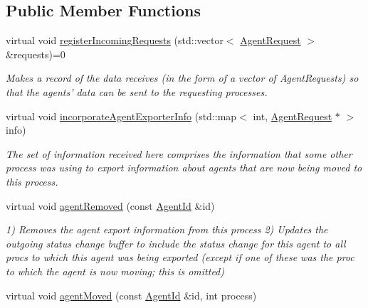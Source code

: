 \subsection*{Public Member Functions}
\begin{DoxyCompactItemize}
\item 
\hypertarget{classrepast_1_1_abstract_exporter_aaf345aa59918904df1847a432f600fba}{virtual void \hyperlink{classrepast_1_1_abstract_exporter_aaf345aa59918904df1847a432f600fba}{register\-Incoming\-Requests} (std\-::vector$<$ \hyperlink{classrepast_1_1_agent_request}{Agent\-Request} $>$ \&requests)=0}\label{classrepast_1_1_abstract_exporter_aaf345aa59918904df1847a432f600fba}

\begin{DoxyCompactList}\small\item\em Makes a record of the data receives (in the form of a vector of Agent\-Requests) so that the agents' data can be sent to the requesting processes. \end{DoxyCompactList}\item 
virtual void \hyperlink{classrepast_1_1_abstract_exporter_a6f75977191b82e5b0c7fc574a9fd4aa1}{incorporate\-Agent\-Exporter\-Info} (std\-::map$<$ int, \hyperlink{classrepast_1_1_agent_request}{Agent\-Request} $\ast$ $>$ info)
\begin{DoxyCompactList}\small\item\em The set of information received here comprises the information that some other process was using to export information about agents that are now being moved to this process. \end{DoxyCompactList}\item 
\hypertarget{classrepast_1_1_abstract_exporter_af3aae158eb37f412c3cb64b7e3be6821}{virtual void \hyperlink{classrepast_1_1_abstract_exporter_af3aae158eb37f412c3cb64b7e3be6821}{agent\-Removed} (const \hyperlink{classrepast_1_1_agent_id}{Agent\-Id} \&id)}\label{classrepast_1_1_abstract_exporter_af3aae158eb37f412c3cb64b7e3be6821}

\begin{DoxyCompactList}\small\item\em 1) Removes the agent export information from this process 2) Updates the outgoing status change buffer to include the status change for this agent to all procs to which this agent was being exported (except if one of these was the proc to which the agent is now moving; this is omitted) \end{DoxyCompactList}\item 
\hypertarget{classrepast_1_1_abstract_exporter_a829612ffd0827dd1120f7dc26f905c36}{virtual void \hyperlink{classrepast_1_1_abstract_exporter_a829612ffd0827dd1120f7dc26f905c36}{agent\-Moved} (const \hyperlink{classrepast_1_1_agent_id}{Agent\-Id} \&id, int process)}\label{classrepast_1_1_abstract_exporter_a829612ffd0827dd1120f7dc26f905c36}


\end{DoxyCompactItemize}
